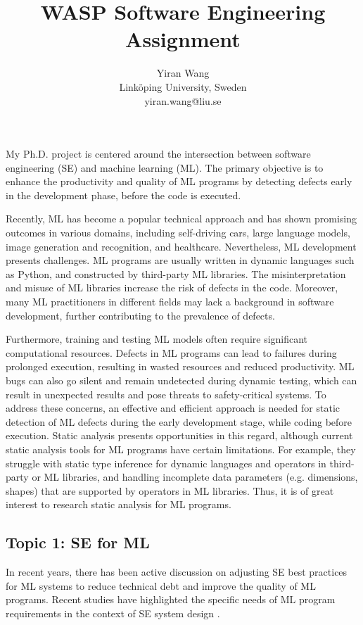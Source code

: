 \documentclass[11pt]{article}
\title{\textbf{WASP Software Engineering Assignment}}
\author{Yiran Wang \\
Linköping University, Sweden \\
yiran.wang@liu.se}
\date{}
\begin{document}
\maketitle

My Ph.D. project is centered around the intersection between software engineering (SE) and machine learning (ML). The primary objective is to enhance the productivity and quality of ML programs by detecting defects early in the development phase, before the code is executed.

Recently, ML has become a popular technical approach and has shown promising outcomes in various domains, including self-driving cars, large language models, image generation and recognition, and healthcare. Nevertheless, ML development presents challenges. ML programs are usually written in dynamic languages such as Python, and constructed by third-party ML libraries. The misinterpretation and misuse of ML libraries increase the risk of defects in the code. Moreover, many ML practitioners in different fields may lack a background in software development, further contributing to the prevalence of defects. 

Furthermore, training and testing ML models often require significant computational resources. Defects in ML programs can lead to failures during prolonged execution, resulting in wasted resources and reduced productivity. ML bugs can also go silent and remain undetected during dynamic testing, which can result in unexpected results and pose threats to safety-critical systems. To address these concerns, an effective and efficient approach is needed for static detection of ML defects during the early development stage, while coding before execution. Static analysis presents opportunities in this regard, although current static analysis tools for ML programs have certain limitations. For example, they struggle with static type inference for dynamic languages and operators in third-party or ML libraries, and handling incomplete data parameters (e.g. dimensions, shapes) that are supported by operators in ML libraries. Thus, it is of great interest to research static analysis for ML programs.

\subsection*{ Topic 1: SE for ML}
In recent years, there has been active discussion on adjusting SE best practices for ML systems to reduce technical debt and improve the quality of ML programs. Recent studies have highlighted the specific needs of ML program requirements in the context of SE system design \cite{amershiSoftwareEngineeringMachine2019}. 
\end{document}
